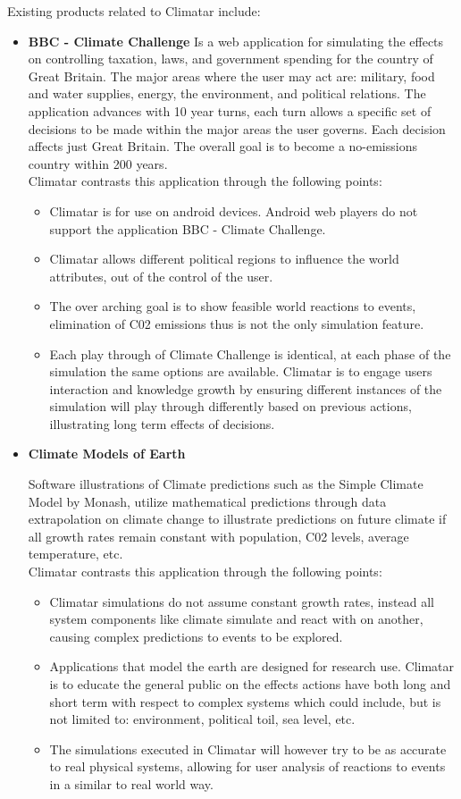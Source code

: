 \documentclass[]{article}
\begin{document}
Existing products related to Climatar include:
\begin{itemize}
	\item \textbf{BBC - Climate Challenge}
		\cite{BBC}Is a web application for simulating the effects on controlling taxation, laws, and government spending for the country of Great Britain. The major areas where the user may act are: military, food and water supplies, energy, the environment, and political relations. The application advances with 10 year turns, each turn allows a specific set of decisions to be made within the major areas the user governs. Each decision affects just Great Britain. The overall goal is to become a no-emissions country within 200 years. \\
		Climatar contrasts this application through the following points:
		\begin{itemize}
			\item Climatar is for use on android devices. Android web players do not support the application BBC - Climate Challenge.
			\item Climatar allows different political regions to influence the world attributes, out of the control of the user.
			\item The over arching goal is to show feasible world reactions to events, elimination of C02 emissions thus is not the only simulation feature.
			\item Each play through of Climate Challenge is identical, at each phase of the simulation the same options are available. Climatar is to engage users interaction and knowledge growth by ensuring different instances of the simulation will play through differently based on previous actions, illustrating long term effects of decisions.
		\end{itemize}

	\item \textbf{Climate Models of Earth}

		Software illustrations of Climate predictions such as the Simple Climate Model by Monash, utilize mathematical predictions through data extrapolation on climate change to illustrate predictions on future climate if all growth rates remain constant with population, C02 levels, average temperature, etc\cite{ClimM}.\\
	Climatar contrasts this application through the following points:
		\begin{itemize}
			\item Climatar simulations do not assume constant growth rates, instead all system components like climate simulate and react with on another, causing complex predictions to events to be explored.
			\item Applications that model the earth are designed for  research use. Climatar is to educate the general public on the effects actions have both long and short term with respect to complex systems which could include, but is not limited to: environment, political toil, sea level, etc.
			\item The simulations executed in Climatar will however try to be as accurate to real physical systems, allowing for user analysis of reactions to events in a similar to real world way.
		\end{itemize}


\end{itemize}
\end{document}

